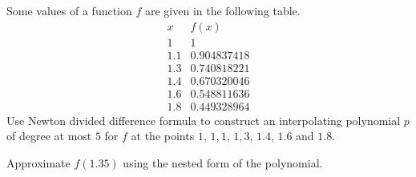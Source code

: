 \begin{question}
Some values of a function $f$ are given in the following table.
\[
\begin{array}{c|c}
x & f(x)\\        %
\hline
 1 & 1 \\
1.1 & 0.904837418 \\
1.3 & 0.740818221 \\
1.4 & 0.670320046 \\
1.6 & 0.548811636 \\
1.8 & 0.449328964
\end{array}
\]
Use Newton divided difference formula to construct an
interpolating polynomial $p$ of degree at most $5$ for $f$ at the points
$1$, $1,1$, $1,3$, $1.4$, $1.6$ and $1.8$.

Approximate $f(1.35)$ using the nested form of the polynomial.
\end{question}

